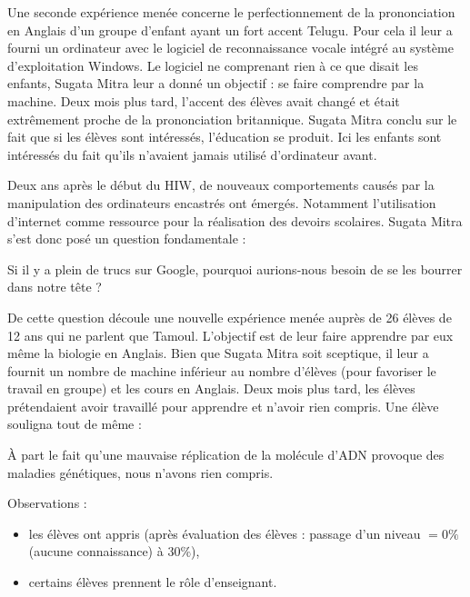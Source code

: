 Une seconde expérience menée concerne le perfectionnement de la prononciation en Anglais d'un groupe d'enfant ayant un fort accent Telugu. Pour cela il leur a fourni  un ordinateur avec le logiciel de reconnaissance vocale intégré au système d'exploitation Windows. Le logiciel ne comprenant rien à ce que disait les enfants, Sugata Mitra leur a donné un objectif : se faire comprendre par la machine. Deux mois plus tard, l'accent des élèves avait changé et était extrêmement proche de la prononciation britannique. Sugata Mitra conclu sur le fait que si les élèves sont intéressés, l'éducation se produit. Ici les enfants sont intéressés du fait qu'ils n'avaient jamais utilisé d'ordinateur avant.

Deux ans après le début du \gls{HIW}, de nouveaux comportements causés par la manipulation des ordinateurs encastrés ont émergés. Notamment l'utilisation d'internet comme ressource pour la réalisation des devoirs scolaires. Sugata Mitra s'est donc posé un question fondamentale :

\begin{coolquote}
Si il y a plein de trucs sur Google, pourquoi aurions-nous besoin de se les bourrer dans notre tête ?
\end{coolquote}

De cette question découle une nouvelle expérience menée auprès de 26 élèves de 12 ans qui ne parlent que Tamoul. L'objectif est de leur faire apprendre par eux même la biologie en Anglais. Bien que Sugata Mitra soit sceptique, il leur a fournit un nombre de machine inférieur au nombre d'élèves (pour favoriser le travail en groupe) et les cours en Anglais. Deux mois plus tard, les élèves prétendaient avoir travaillé pour apprendre et n'avoir rien compris. Une élève souligna tout de même :

\begin{coolquote}
  À part le fait qu'une mauvaise réplication de la molécule d'ADN provoque des maladies génétiques, nous n'avons rien compris.
\end{coolquote}

Observations : 

\begin{itemize}
\item les élèves ont appris (après évaluation des élèves : passage d'un niveau $ = 0\%$ (aucune connaissance) à $30\%$),
\item certains élèves prennent le rôle d'enseignant.
\end{itemize}

